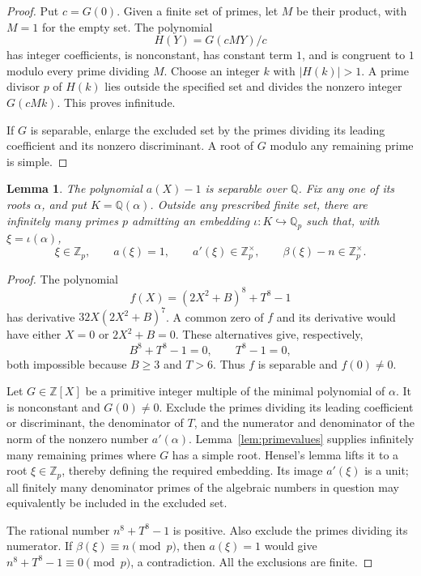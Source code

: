 \documentclass[11pt,a4paper]{article}
\newtheorem{lemma}[theorem]{Lemma}
\theoremstyle{remark}\newtheorem{remark}[theorem]{Remark}
\newcommand{\Q}{\mathbb Q}\newcommand{\Z}{\mathbb Z}
\begin{document}
\begin{proof}
Put \(c=G(0)\). Given a finite set of primes, let \(M\) be their
product, with \(M=1\) for the empty set. The polynomial
\[
                        H(Y)=G(cMY)/c
\]
has integer coefficients, is nonconstant, has constant term
\(1\), and is congruent to \(1\) modulo every prime dividing
\(M\). Choose an integer \(k\) with \(|H(k)|>1\).
A prime divisor \(p\) of \(H(k)\) lies outside the specified set
and divides the nonzero integer \(G(cMk)\).
This proves infinitude.

If \(G\) is separable, enlarge the excluded set by the primes
dividing its leading coefficient and its nonzero discriminant.
A root of \(G\) modulo any remaining prime is simple.
\end{proof}

\begin{lemma}\label{lem:scale}
The polynomial \(a(X)-1\) is separable over \(\Q\).
Fix any one of its roots \(\alpha\), and put \(K=\Q(\alpha)\).
Outside any prescribed finite set, there are infinitely many
primes \(p\) admitting an embedding \(\iota:K\hookrightarrow\Q_p\)
such that, with \(\xi=\iota(\alpha)\),
\[
       \xi\in\Z_p,\qquad a(\xi)=1,\qquad
       a'(\xi)\in\Z_p^\times,\qquad
       \beta(\xi)-n\in\Z_p^\times .
\]
\end{lemma}

\begin{proof}
The polynomial
\[
               f(X)=(2X^2+B)^8+T^8-1
\]
has derivative \(32X(2X^2+B)^7\).
A common zero of \(f\) and its derivative would have either
\(X=0\) or \(2X^2+B=0\). These alternatives give, respectively,
\[
                    B^8+T^8-1=0,\qquad T^8-1=0,
\]
both impossible because \(B\ge3\) and \(T>6\).
Thus \(f\) is separable and \(f(0)\ne0\).

Let \(G\in\Z[X]\) be a primitive integer multiple of the
minimal polynomial of \(\alpha\). It is nonconstant and
\(G(0)\ne0\). Exclude the primes dividing its leading coefficient
or discriminant, the denominator of \(T\), and the numerator
and denominator of the norm of the nonzero number \(a'(\alpha)\).
Lemma~\ref{lem:primevalues} supplies infinitely many remaining
primes where \(G\) has a simple root. Hensel's lemma lifts it
to a root \(\xi\in\Z_p\), thereby defining the required embedding.
Its image \(a'(\xi)\) is a unit; all finitely many denominator
primes of the algebraic numbers in question may equivalently
be included in the excluded set.

The rational number \(n^8+T^8-1\) is positive.
Also exclude the primes dividing its numerator. If
\(\beta(\xi)\equiv n\pmod p\), then \(a(\xi)=1\) would give
\(n^8+T^8-1\equiv0\pmod p\), a contradiction.
All the exclusions are finite.
\end{proof}
\end{document}
